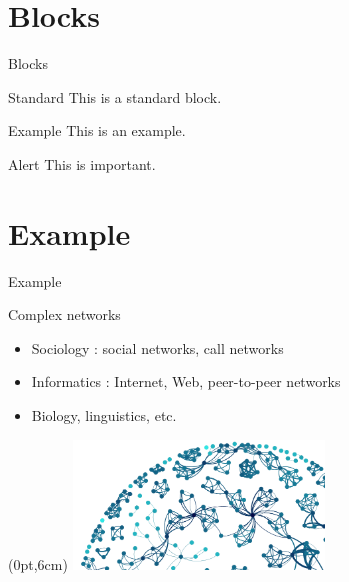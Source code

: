 \documentclass{beamer}
\begin{document}
\section{Blocks}

\begin{frame}{Blocks}

\begin{block}{Standard}
This is a standard block.
\end{block}

\begin{exampleblock}{Example}
This is an example.
\end{exampleblock}

\begin{alertblock}{Alert}
This is important.
\end{alertblock}
\end{frame}


\section{Example}

\begin{frame}{Example}

\begin{block}{Complex networks}
\begin{itemize}
\item Sociology : social networks, call networks
\item Informatics : Internet, Web, peer-to-peer networks
\item Biology, linguistics, etc.
\end{itemize}
\end{block}

\vspace{1.6cm}

\begin{textblock*}{\paperwidth}(0pt,6cm)
    \raggedleft \includegraphics[width=0.5\textwidth]{static-graph1}
\end{textblock*}
\end{frame}
\end{document}
